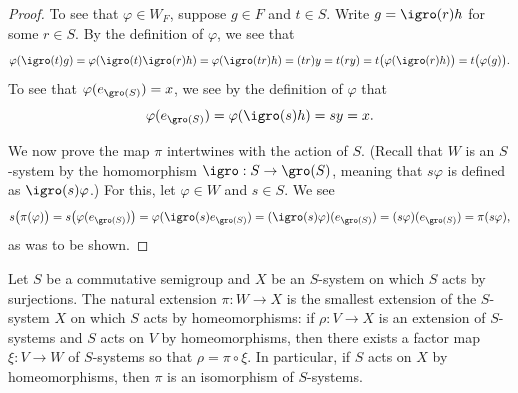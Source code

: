 \begin{proof}
    To see that $\varphi \in W_F$, suppose $g \in F$ and $t \in S$.  Write $g = \igro(r)h$ for some $r \in S$. By the definition of $\varphi$, we see that
    \[
        \varphi(\igro(t) g) = \varphi(\igro(t)\igro(r)h) = \varphi(\igro(tr)h) = (tr)y = t(ry) = t \big(\varphi(\igro(r)h)\big) = t\big(\varphi(g)\big).
    \]
    To see that $\varphi(e_{\gro(S)}) = x$, we see by the definition of $\varphi$ that
    \[\varphi(e_{\gro(S)}) = \varphi(\igro(s)h) = sy = x.\]

    We now prove the map $\pi$ intertwines with the action of $S$. (Recall that $W$ is an $S$-system by the homomorphism $\igro: S \to \gro(S)$, meaning that $s \varphi$ is defined as $\igro(s) \varphi$.)  For this, let $\varphi \in W$ and $s \in S$.  We see
    \[
        s \big(\pi (\varphi)\big) = s \big(\varphi(e_{\gro(S)})\big) = \varphi(\igro(s) e_{\gro(S)}) = (\igro(s) \varphi)(e_{\gro(S)}) = (s \varphi)(e_{\gro(S)}) = \pi (s \varphi),
    \]
    as was to be shown.
\end{proof}


\begin{theorem}
\label{lemma_nat_ext_univeral_prop}
Let $S$ be a commutative semigroup and $X$ be an $S$-system on which $S$ acts by surjections. The natural extension $\pi: W \to X$ is the smallest extension of the $S$-system $X$ on which $S$ acts by homeomorphisms: if $\rho: V \to X$ is an extension of $S$-systems and $S$ acts on $V$ by homeomorphisms, then there exists a factor map $\xi: V \to W$ of $S$-systems so that $\rho = \pi \circ \xi$.  In particular, if $S$ acts on $X$ by homeomorphisms, then $\pi$ is an isomorphism of $S$-systems.
\end{theorem}

